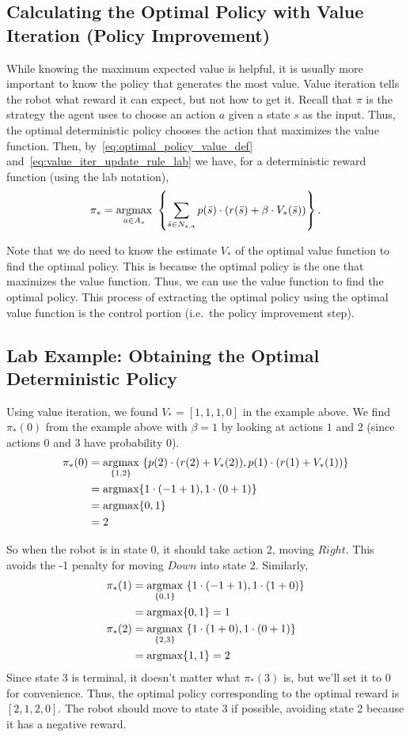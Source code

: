 \subsection*{Calculating the Optimal Policy with Value Iteration (Policy Improvement)}
While knowing the maximum expected value is helpful, it is usually more important to know the policy that generates the most value.
Value iteration tells the robot what reward it can expect, but not how to get it.
Recall that $\pi$ is the strategy the agent uses to choose an action $a$ given a state $s$ as the input.
Thus, the optimal deterministic policy chooses the action that maximizes the value function.
Then, by\ \ref{eq:optimal_policy_value_def} and\ \ref{eq:value_iter_update_rule_lab} we have, for a deterministic reward function (using the lab notation),
\begin{equation}
\label{eq:optimal_policy_value_iter_lab}
\pi_* = \underset{a\in A_s}{\mbox{argmax}}\text{ }\left\{\sum_{\bar{s}\in N_{s,a}} p(\bar{s})\cdot(r(\bar{s}) + \beta\cdot V_*(\bar{s}))\right\}.
\end{equation}

Note that we do need to know the estimate $V_*$ of the optimal value function to find the optimal policy.
This is because the optimal policy is the one that maximizes the value function.
Thus, we can use the value function to find the optimal policy.
This process of extracting the optimal policy using the optimal value function is the control portion (i.e.\ the policy improvement step).

\subsection*{Lab Example: Obtaining the Optimal Deterministic Policy}
Using value iteration, we found $V_*  = [1, 1, 1, 0]$ in the example above.
We find $\pi_*(0)$ from the example above with $\beta = 1$ by looking at actions $1$ and $2$ (since actions 0 and 3 have probability 0).
\begin{align*}
\pi_*(0) &=\underset{\{1,2\}}{\mbox{argmax}}\text{ } \{p(2)\cdot(r(2) + V_*(2)), p(1)\cdot(r(1)+V_*(1))\} \\
&= \mbox{argmax} \{1\cdot(-1+1), 1\cdot(0+1)\} \\
&= \mbox{argmax}\{0, 1\}\\
&= 2
\end{align*}

So when the robot is in state 0, it should take action 2, moving $Right$.
This avoids the -1 penalty for moving $Down$ into state 2.
Similarly,
\begin{align*}
\pi_*(1) &= \underset{\{0,1\}}{\mbox{argmax}}\text{ } \{1\cdot(-1+1), 1\cdot(1+0)\} \\
&= \mbox{argmax} \{0, 1\} = 1 \\
\pi_*(2) &= \underset{\{2,3\}}{\mbox{argmax}}\text{ } \{1\cdot(1+0), 1\cdot(0+1)\} \\
&= \mbox{argmax} \{1, 1\} = 2
\end{align*}
Since state 3 is terminal, it doesn't matter what $\pi_*(3)$ is, but we'll set it to 0 for convenience.
Thus, the optimal policy corresponding to the optimal reward is $[2,1,2,0]$.
The robot should move to state 3 if possible, avoiding state 2 because it has a negative reward.

